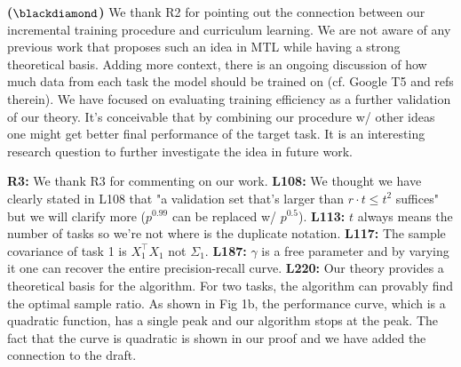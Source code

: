 \documentclass{article}
\begin{document}
\vspace{-0.045in}
\textbf{($\blackdiamond$)}  We thank R2 for pointing out the connection between our incremental training procedure and curriculum learning.
We are not aware of any previous work that proposes such an idea in MTL while having a strong theoretical basis.
Adding more context, there is an ongoing discussion of how much data from each task the model should be trained on (cf. Google T5 and refs therein).
We have focused on evaluating training efficiency as a further validation of our theory.
It's conceivable that by combining our procedure w/ other ideas one might get better final performance of the target task.
It is an interesting research question to further investigate the idea in future work.

\vspace{-0.025in}
\textbf{R3:}
We thank R3 for commenting on our work.
\textbf{L108:}
We thought we have clearly stated in L108 that "a validation set that's larger than $r\cdot t \le t^2$ suffices" but we will clarify more ($p^{0.99}$ can be replaced w/ $p^{0.5}$).
\textbf{L113:} $t$ always means the number of tasks so we're not where is the duplicate notation.
\textbf{L117:} The sample covariance of task 1 is  $X_1^{\top}X_1$ not $\Sigma_1$.
\textbf{L187:} $\gamma$ is a free parameter and by varying it one can recover the entire precision-recall curve.
\textbf{L220:} Our theory provides a theoretical basis for the algorithm.
For two tasks, the algorithm can provably find the optimal sample ratio. As shown in Fig 1b, the performance curve, which is a quadratic function, has a single peak and our algorithm stops at the peak.
The fact that the curve is quadratic is shown in our proof and we have added the connection to the draft.
\end{document}
